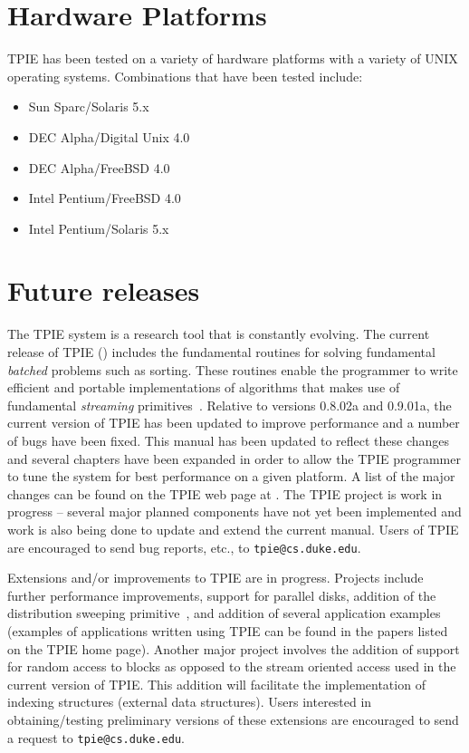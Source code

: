 \section{Hardware Platforms}

TPIE has been tested on a variety of hardware platforms with a variety of
UNIX operating systems. Combinations that have been tested
include:
\begin{itemize}
\item Sun Sparc/Solaris 5.x
\item DEC Alpha/Digital Unix 4.0
\item DEC Alpha/FreeBSD 4.0
\item Intel Pentium/FreeBSD 4.0
\item Intel Pentium/Solaris 5.x
\end{itemize}


\section{Future releases}

The TPIE system is a research tool that is constantly
evolving.  The current release of TPIE (\version) includes
the fundamental routines for solving fundamental {\em
   batched} problems such as sorting. These routines enable
the programmer to write efficient and portable
implementations of algorithms that makes use of fundamental
{\em streaming}
primitives~\cite{arge:gisbook,vitter:podssurvey}. Relative
to versions 0.8.02a and 0.9.01a, the current version of TPIE
has been updated to improve performance and a number of
bugs have been fixed. This manual has been updated to
reflect these changes and several chapters have been
expanded in order to allow the TPIE programmer to tune the
system for best performance on a given platform. A list of
the major changes can be found on the TPIE web page at
. The
TPIE project is work in progress -- several major planned
components have not yet been implemented and work is also
being done to update and extend the current manual. Users of
TPIE are encouraged to send bug reports, etc., to
\verb|tpie@cs.duke.edu|.

Extensions and/or improvements to TPIE are in progress.
Projects include further performance improvements, support
for parallel disks, addition of the distribution sweeping
primitive~\cite{goodrich:external}, and addition of several
application examples (examples of applications written using
TPIE can be found in the papers listed on the TPIE home
page). Another major project involves the addition of
support for random access to blocks as opposed to the stream
oriented access used in the current version of TPIE. This
addition will facilitate the implementation of indexing
structures (external data structures). Users interested in
obtaining/testing preliminary versions of these extensions
are encouraged to send a request to \verb|tpie@cs.duke.edu|.



